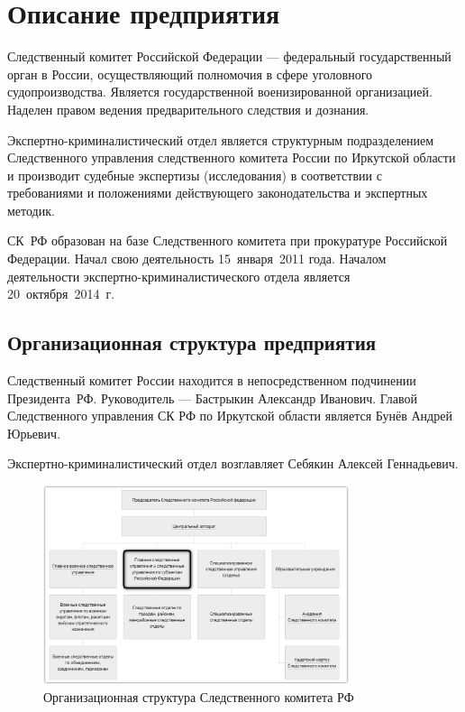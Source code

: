\section{Описание предприятия}

Следственный комитет Российской Федерации --- федеральный государственный орган в России, осуществляющий полномочия в сфере уголовного судопроизводства. Является государственной военизированной организацией. Наделен правом ведения предварительного следствия и дознания.

Экспертно-криминалистический отдел является структурным подразделением Следственного управления следственного комитета России по Иркутской области и производит судебные экспертизы (исследования) в соответствии с требованиями и положениями действующего законодательства и экспертных методик.

СК~РФ образован на базе Следственного комитета при прокуратуре Российской Федерации\cite{order33}. Начал свою деятельность 15~января~2011 года. Началом деятельности экспертно-криминалистического отдела является 20~октября~2014~г.\cite{order71}

\subsection{Организационная структура предприятия}

Следственный комитет России находится в непосредственном подчинении Президента~РФ. Руководитель --- Бастрыкин Александр Иванович. Главой Следственного управления СК РФ по Иркутской области является Бунёв Андрей Юрьевич.

Экспертно-криминалистический отдел возглавляет Себякин Алексей Геннадьевич.

\begin{figure}[H]
	\centering
	\includegraphics[width=0.8\textwidth]{pics/general_struct.png}
	\caption{Организационная структура Следственного комитета РФ}
	\label{fig:org_struct}
\end{figure}

